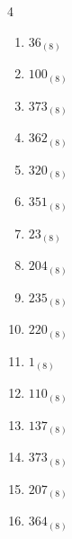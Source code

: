 \begin{multicols}{4}
\begin{enumerate}
  \item $36_{(8)}$

        \phantom{$=30$}

  \item $100_{(8)}$

        \phantom{$=64$}

  \item $373_{(8)}$

        \phantom{$=251$}

  \item $362_{(8)}$

        \phantom{$=242$}

  \item $320_{(8)}$

        \phantom{$=208$}

  \item $351_{(8)}$

        \phantom{$=233$}

  \item $23_{(8)}$

        \phantom{$=19$}

  \item $204_{(8)}$

        \phantom{$=132$}

  \item $235_{(8)}$

        \phantom{$=157$}

  \item $220_{(8)}$

        \phantom{$=144$}

  \item $1_{(8)}$

        \phantom{$=1$}

  \item $110_{(8)}$

        \phantom{$=72$}

\columnbreak %

  \item $137_{(8)}$

        \phantom{$=95$}

  \item $373_{(8)}$

        \phantom{$=251$}

  \item $207_{(8)}$

        \phantom{$=135$}

  \item $364_{(8)}$


\end{enumerate}
\end{multicols}
